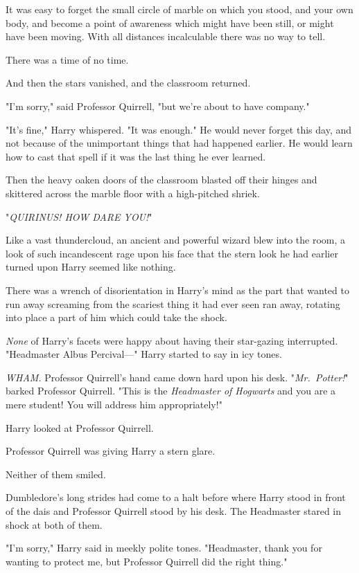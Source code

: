 It was easy to forget the small circle of marble on which you stood, and your 
own body, and become a point of awareness which might have been still, or might 
have been moving. With all distances incalculable there was no way to tell.

There was a time of no time.

And then the stars vanished, and the classroom returned.

"I'm sorry," said Professor Quirrell, "but we're about to have company."

"It's fine," Harry whispered. "It was enough." He would never forget this day, 
and not because of the unimportant things that had happened earlier. He would 
learn how to cast that spell if it was the last thing he ever learned.

Then the heavy oaken doors of the classroom blasted off their hinges and 
skittered across the marble floor with a high-pitched shriek.

"\emph{QUIRINUS! HOW DARE YOU!}"

Like a vast thundercloud, an ancient and powerful wizard blew into the room, a 
look of such incandescent rage upon his face that the stern look he had earlier 
turned upon Harry seemed like nothing.

There was a wrench of disorientation in Harry's mind as the part that wanted to 
run away screaming from the scariest thing it had ever seen ran away, rotating 
into place a part of him which could take the shock.

\emph{None} of Harry's facets were happy about having their star-gazing 
interrupted. "Headmaster Albus Percival---" Harry started to say in icy tones.

\emph{WHAM.} Professor Quirrell's hand came down hard upon his desk. 
"\emph{Mr.~Potter!}" barked Professor Quirrell. "This is the \emph{Headmaster 
of Hogwarts} and you are a mere student! You will address him appropriately!"

Harry looked at Professor Quirrell.

Professor Quirrell was giving Harry a stern glare.

Neither of them smiled.

Dumbledore's long strides had come to a halt before where Harry stood in front 
of the dais and Professor Quirrell stood by his desk. The Headmaster stared in 
shock at both of them.

"I'm sorry," Harry said in meekly polite tones. "Headmaster, thank you for 
wanting to protect me, but Professor Quirrell did the right thing."

